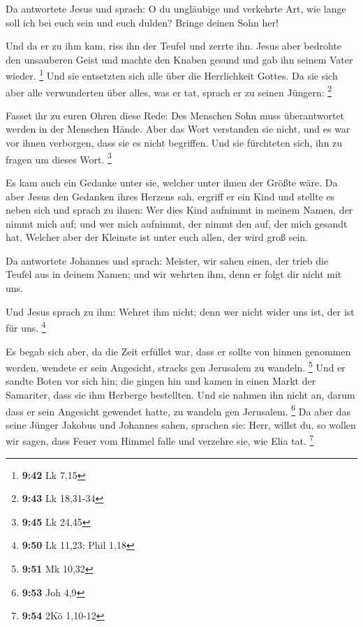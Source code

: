  Da antwortete Jesus und sprach: O du ungläubige und
verkehrte Art, wie lange soll ich bei euch sein und euch dulden? Bringe
deinen Sohn her!

 Und da er zu ihm kam, riss ihn der Teufel und zerrte ihn.
Jesus aber bedrohte den unsauberen Geist und machte den Knaben gesund
und gab ihn seinem Vater wieder. \footnote{\textbf{9:42} Lk 7,15}
 Und sie entsetzten sich alle über die Herrlichkeit Gottes.
Da sie sich aber alle verwunderten über alles, was er tat, sprach er zu
seinen Jüngern: \footnote{\textbf{9:43} Lk 18,31-34}

 Fasset ihr zu euren Ohren diese Rede: Des Menschen Sohn
muss überantwortet werden in der Menschen Hände.  Aber das
Wort verstanden sie nicht, und es war vor ihnen verborgen, dass sie es
nicht begriffen. Und sie fürchteten sich, ihn zu fragen um dieses Wort.
\footnote{\textbf{9:45} Lk 24,45}

 Es kam auch ein Gedanke unter sie, welcher unter ihnen der
Größte wäre.  Da aber Jesus den Gedanken ihres Herzens sah,
ergriff er ein Kind und stellte es neben sich  und sprach
zu ihnen: Wer dies Kind aufnimmt in meinem Namen, der nimmt mich auf;
und wer mich aufnimmt, der nimmt den auf, der mich gesandt hat. Welcher
aber der Kleinste ist unter euch allen, der wird groß sein.

 Da antwortete Johannes und sprach: Meister, wir sahen
einen, der trieb die Teufel aus in deinem Namen; und wir wehrten ihm,
denn er folgt dir nicht mit uns.

 Und Jesus sprach zu ihm: Wehret ihm nicht; denn wer nicht
wider uns ist, der ist für uns. \footnote{\textbf{9:50} Lk 11,23; Phil
  1,18}

 Es begab sich aber, da die Zeit erfüllet war, dass er
sollte von hinnen genommen werden, wendete er sein Angesicht, stracks
gen Jerusalem zu wandeln. \footnote{\textbf{9:51} Mk 10,32}
 Und er sandte Boten vor sich hin; die gingen hin und kamen
in einen Markt der Samariter, dass sie ihm Herberge bestellten.
 Und sie nahmen ihn nicht an, darum dass er sein Angesicht
gewendet hatte, zu wandeln gen Jerusalem. \footnote{\textbf{9:53} Joh
  4,9}  Da aber das seine Jünger Jakobus und Johannes
sahen, sprachen sie: Herr, willst du, so wollen wir sagen, dass Feuer
vom Himmel falle und verzehre sie, wie Elia tat. \footnote{\textbf{9:54}
  2Kö 1,10-12}

